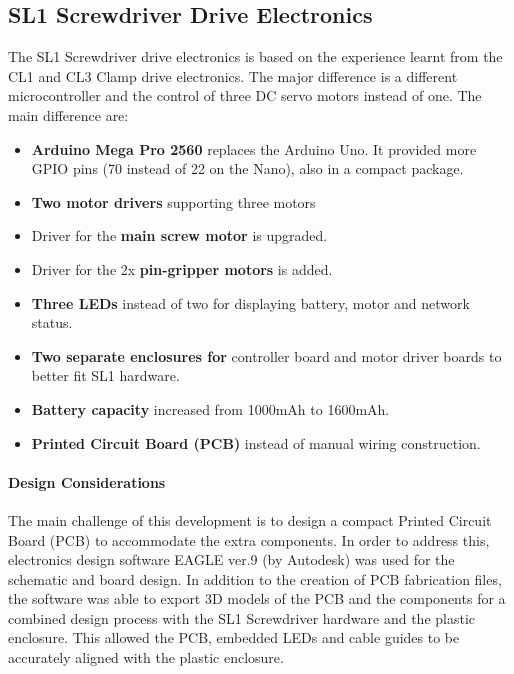\subsection{SL1 Screwdriver Drive Electronics}
\label{subsection:exploration-4-sl1-screwdriver-electronics}

The SL1 Screwdriver drive electronics is based on the experience learnt from the CL1 and CL3 Clamp drive electronics. The major difference is a different microcontroller and the control of three DC servo motors instead of one. The main difference are:

\begin{itemize}[nosep]
    \item \textbf{Arduino Mega Pro 2560} replaces the Arduino Uno. It provided more GPIO pins (70 instead of 22 on the Nano), also in a compact package.
    \item \textbf{Two motor drivers} supporting three motors
    \item Driver for the \textbf{main screw motor} is upgraded.
    \item Driver for the 2x \textbf{pin-gripper motors} is added.
    \item \textbf{Three LEDs} instead of two for displaying battery, motor and network status.
    \item \textbf{Two separate enclosures for }controller board and motor driver boards to better fit SL1 hardware.
    \item \textbf{Battery capacity} increased from 1000mAh to 1600mAh.
    \item \textbf{Printed Circuit Board (PCB)} instead of manual wiring construction.
\end{itemize}

\paragraph{Design Considerations}
The main challenge of this development is to design a compact Printed Circuit Board (PCB) to accommodate the extra components. In order to address this, electronics design software EAGLE ver.9 (by Autodesk) was used for the schematic and board design. In addition to the creation of PCB fabrication files, the software was able to export 3D models of the PCB and the components for a combined design process with the SL1 Screwdriver hardware and the plastic enclosure. This allowed the PCB, embedded LEDs and cable guides to be accurately aligned with the plastic enclosure.

